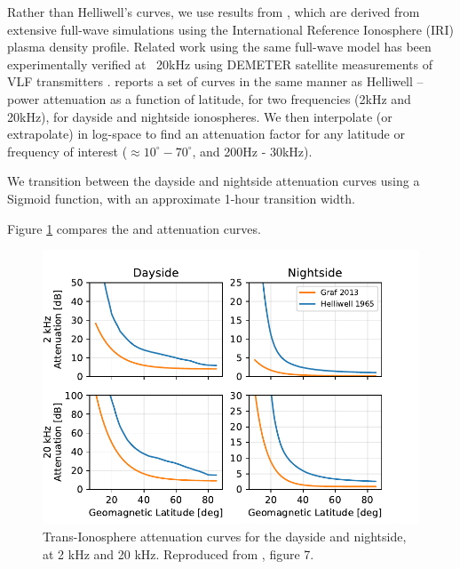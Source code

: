 Rather than Helliwell's curves, we use results from \cite{Graf2013}, which are derived from extensive full-wave simulations using the International Reference Ionosphere (IRI) plasma density profile. Related work using the same full-wave model has been experimentally verified at ~20kHz using DEMETER satellite measurements of VLF transmitters \citep{Cohen2012}. \citeauthor{Graf2013} reports a set of curves in the same manner as Helliwell -- power attenuation as a function of latitude, for two frequencies (2kHz and 20kHz), for dayside and nightside ionospheres. We then interpolate (or extrapolate) in log-space to find an attenuation factor for any latitude or frequency of interest ($\approx 10^\circ - 70^\circ$, and 200Hz - 30kHz).

We transition between the dayside and nightside attenuation curves using a Sigmoid function, with an approximate 1-hour transition width.

Figure \ref{fig:graf_curves} compares the \cite{Graf2013} and \cite{Helliwell1965} attenuation curves.

\begin{figure}[h]
\begin{center}
\includegraphics{figures/iono_absorp_curves}
\caption[Trans-Ionosphere attenuation curves for day and night]{Trans-Ionosphere attenuation curves for the dayside and nightside, at 2 kHz and 20 kHz. Reproduced from \cite{Graf2013}, figure 7.}
\label{fig:graf_curves}
\end{center}
\end{figure}